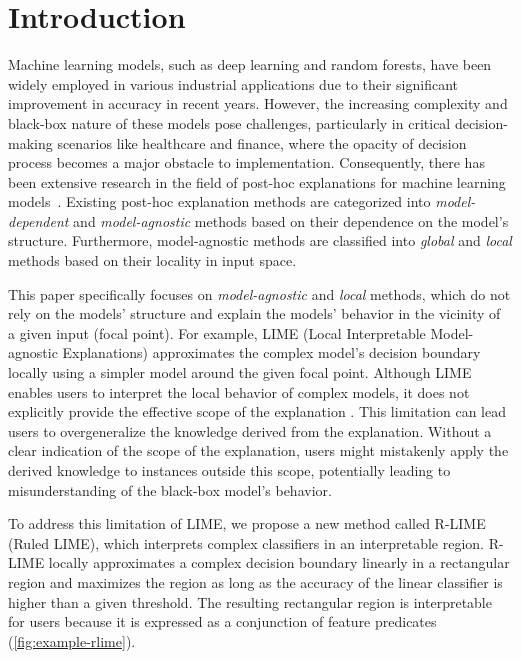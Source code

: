 \documentclass[11pt]{article}
\begin{document}
\section{Introduction}
Machine learning models, such as deep learning and random forests,
have been widely employed in various industrial applications
due to their significant improvement in accuracy in recent years.
However,
the increasing complexity and black-box nature of these models pose challenges,
particularly in critical decision-making scenarios like healthcare and finance,
where the opacity of decision process becomes a major obstacle to
implementation.
Consequently,
there has been extensive research in the field of post-hoc explanations
for machine learning models~\cite{%
	guidotti2018local,radulovic2023bella,ribeiro2016why,ribeiro2018anchors}.
Existing post-hoc explanation methods are categorized
into \emph{model-dependent} and \emph{model-agnostic} methods
based on their dependence on the model's structure.
Furthermore, model-agnostic methods are classified into
\emph{global} and \emph{local} methods based on their locality in input space.

This paper specifically focuses
on \emph{model-agnostic} and \emph{local} methods,
which do not rely on the models' structure
and explain the models' behavior
in the vicinity of a given input (focal point).
For example, LIME (Local Interpretable Model-agnostic Explanations)
\cite{ribeiro2016why} approximates the complex model's decision boundary
locally using a simpler model around the given focal point.
Although LIME enables users to interpret the local behavior of complex models,
it does not explicitly provide the effective scope of the explanation
\cite{ribeiro2018anchors}.
This limitation can lead
users to overgeneralize the knowledge derived from the explanation.
Without a clear indication of the scope of the explanation,
users might mistakenly apply
the derived knowledge to instances outside this scope,
potentially leading to misunderstanding of the black-box model's behavior.

To address this limitation of LIME,
we propose a new method called R-LIME (Ruled LIME),
which interprets complex classifiers in an interpretable region.
R-LIME locally approximates a complex decision boundary linearly
in a rectangular region and maximizes the region
as long as the accuracy of the linear classifier is
higher than a given threshold.
The resulting rectangular region is interpretable for users because it is
expressed as a conjunction of feature predicates (\cref{fig:example-rlime}).
\end{document}
